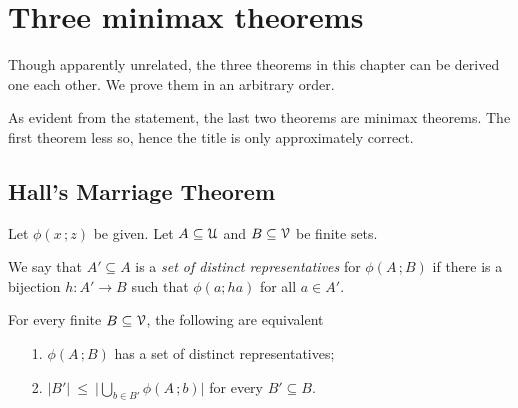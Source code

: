\documentclass[scombinatorics.tex]{subfiles}
\begin{document}
\chapter{Three minimax theorems}
\label{minimax}

\def\medrel#1{\parbox[t]{6ex}{$\displaystyle\hfil #1$}}
\def\ceq#1#2#3{\parbox[t]{30ex}{$\displaystyle #1$}\medrel{#2}{$\displaystyle #3$}}

\def\separatore{\hfil o \rule[0.5ex]{4ex}{0.1ex} o \rule[0.5ex]{4ex}{0.1ex} o}

Though apparently unrelated, the three theorems in this chapter can be derived one each other.
We prove them in an arbitrary order.

As evident from the statement, the last two theorems are minimax theorems.
The first theorem less so, hence the title is only approximately correct.

\section{Hall's Marriage Theorem}\label{marriage}

\def\ceq#1#2#3{\parbox[t]{30ex}{$\displaystyle #1$}\medrel{#2}{$\displaystyle #3$}}

Let $\phi(x\,;z)$ be given. 
Let $A\subseteq\EuScript U$ and $B\subseteq\EuScript V$ be finite sets.

We say that $A'\subseteq A$ is a \emph{set of distinct representatives\/} for $\phi(A\,;B)$ if there is a bijection $h:A'\to B$ such that $\phi(a;ha)$ for all $a\in A'$.

\begin{void_thm}\label{thm_marriage}
  For every finite $B\subseteq\EuScript V$, the following are equivalent
  \begin{itemize}
    \item[1.] $\phi(A\,;B)$ has a set of distinct representatives;

    \item[2.] $\displaystyle|B'|\ \le\ \bigg|\bigcup_{b\in B'}\phi(A\,;b)\bigg|$ for every $B'\subseteq B$.
  \end{itemize}
\end{void_thm}
\end{document}
